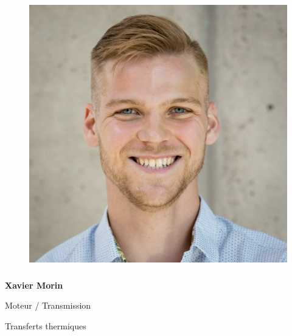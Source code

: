 \documentclass[a0paper,portrait]{baposter}
\begin{document}
\begin{poster}
{\begin{figure}
\includegraphics[width=.9\linewidth]{img/membres/Xavier-Morin-2.jpg} 
\end{figure}
\subsubsection*{}
\vspace{2mm}
\textbf{Xavier Morin}

Moteur / Transmission

Transferts thermiques

\vspace{2mm}
}




\end{poster}
\end{document}
